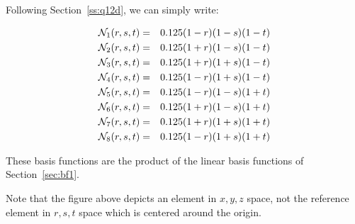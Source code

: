 Following Section~\ref{ss:q12d}, we can simply write:

\begin{mdframed}[backgroundcolor=blue!5]
\begin{eqnarray}
{\mathcal{N}}_1(r,s,t)&=&0.125(1-r)(1-s)(1-t) \nonumber\\ 
{\mathcal{N}}_2(r,s,t)&=&0.125(1+r)(1-s)(1-t) \nonumber\\ 
{\mathcal{N}}_3(r,s,t)&=&0.125(1+r)(1+s)(1-t) \nonumber\\ 
{\mathcal{N}}_4(r,s,t)&=&0.125(1-r)(1+s)(1-t) \nonumber\\ 
{\mathcal{N}}_5(r,s,t)&=&0.125(1-r)(1-s)(1+t) \nonumber\\ 
{\mathcal{N}}_6(r,s,t)&=&0.125(1+r)(1-s)(1+t) \nonumber\\ 
{\mathcal{N}}_7(r,s,t)&=&0.125(1+r)(1+s)(1+t) \nonumber\\ 
{\mathcal{N}}_8(r,s,t)&=&0.125(1-r)(1+s)(1+t) \nonumber
\end{eqnarray}
\end{mdframed}
These basis functions are the product of the linear basis functions of Section~\ref{sec:bf1}.

\begin{center}

\end{center}
Note that the figure above depicts an element in $x,y,z$ space, not the reference
element in $r,s,t$ space which is centered around the origin.
